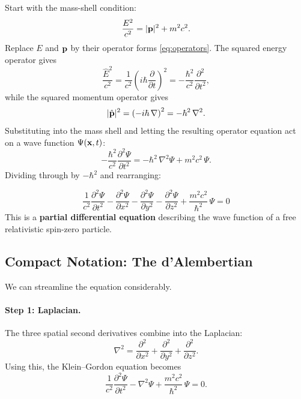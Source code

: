 \documentclass[12pt, a4paper]{article}
\theoremstyle{definition}
\begin{document}
\begin{derivation}
Start with the mass-shell condition:
\[
    \frac{E^{2}}{c^{2}} = |\vb{p}|^{2} + m^{2}c^{2}.
\]
Replace $E$ and $\vb{p}$ by their operator forms \eqref{eq:operators}.
The squared energy operator gives
\[
    \frac{\hat{E}^{2}}{c^{2}}
    = \frac{1}{c^{2}}\!\left(i\hbar\frac{\partial}{\partial t}\right)^{\!2}
    = -\frac{\hbar^{2}}{c^{2}}\frac{\partial^{2}}{\partial t^{2}},
\]
while the squared momentum operator gives
\[
    |\hat{\vb{p}}|^{2}
    = \left(-i\hbar\,\nabla\right)^{2}
    = -\hbar^{2}\,\nabla^{2}.
\]
Substituting into the mass shell and letting the resulting operator equation
act on a wave function $\Psi(\vb{x},t)$:
\[
    -\frac{\hbar^{2}}{c^{2}}\frac{\partial^{2}\Psi}{\partial t^{2}}
    = -\hbar^{2}\,\nabla^{2}\Psi + m^{2}c^{2}\,\Psi.
\]
Dividing through by $-\hbar^{2}$ and rearranging:
\end{derivation}

\begin{result}
\begin{equation}\label{eq:KG-explicit}
    \boxed{\;
    \frac{1}{c^{2}}\frac{\partial^{2}\Psi}{\partial t^{2}}
    - \frac{\partial^{2}\Psi}{\partial x^{2}}
    - \frac{\partial^{2}\Psi}{\partial y^{2}}
    - \frac{\partial^{2}\Psi}{\partial z^{2}}
    + \frac{m^{2}c^{2}}{\hbar^{2}}\,\Psi = 0
    \;}
\end{equation}
This is a \textbf{partial differential equation} describing the wave function
of a free relativistic spin-zero particle.
\end{result}

\subsection{Compact Notation: The d'Alembertian}

We can streamline the equation considerably.

\paragraph{Step 1: Laplacian.}
The three spatial second derivatives combine into the Laplacian:
\[
    \nabla^{2}
    = \frac{\partial^{2}}{\partial x^{2}}
    + \frac{\partial^{2}}{\partial y^{2}}
    + \frac{\partial^{2}}{\partial z^{2}}.
\]
Using this, the Klein--Gordon equation becomes
\begin{equation}\label{eq:KG-laplacian}
    \frac{1}{c^{2}}\frac{\partial^{2}\Psi}{\partial t^{2}}
    - \nabla^{2}\Psi
    + \frac{m^{2}c^{2}}{\hbar^{2}}\,\Psi = 0.
\end{equation}
\end{document}
